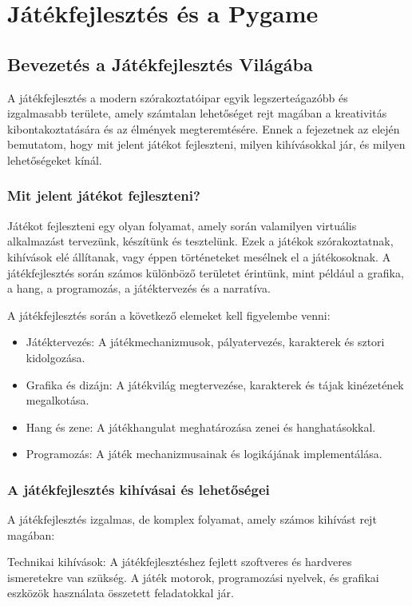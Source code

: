 \chapter{Játékfejlesztés és a Pygame}

\section{Bevezetés a Játékfejlesztés Világába}

\indent \indent A játékfejlesztés a modern szórakoztatóipar egyik legszerteágazóbb és izgalmasabb területe, amely számtalan lehetőséget rejt magában a kreativitás kibontakoztatására és az élmények megteremtésére. Ennek a fejezetnek az elején bemutatom, hogy mit jelent játékot fejleszteni, milyen kihívásokkal jár, és milyen lehetőségeket kínál.

\subsection{Mit jelent játékot fejleszteni?}
\indent \indent Játékot fejleszteni egy olyan folyamat, amely során valamilyen virtuális alkalmazást tervezünk, készítünk és tesztelünk. Ezek a játékok szórakoztatnak, kihívások elé állítanak, vagy éppen történeteket mesélnek el a játékosoknak. A játékfejlesztés során számos különböző területet érintünk, mint például a grafika, a hang, a programozás, a játéktervezés és a narratíva.

A játékfejlesztés során a következő elemeket kell figyelembe venni:

\begin{itemize}
    \item Játéktervezés: A játékmechanizmusok, pályatervezés, karakterek és sztori kidolgozása.
    \item Grafika és dizájn: A játékvilág megtervezése, karakterek és tájak kinézetének megalkotása.
    \item Hang és zene: A játékhangulat meghatározása zenei és hanghatásokkal.
    \item Programozás: A játék mechanizmusainak és logikájának implementálása.
\end{itemize}
\subsection{A játékfejlesztés kihívásai és lehetőségei}
\indent \indent A játékfejlesztés izgalmas, de komplex folyamat, amely számos kihívást rejt magában:

Technikai kihívások: A játékfejlesztéshez fejlett szoftveres és hardveres ismeretekre van szükség. A játék motorok, programozási nyelvek, és grafikai eszközök használata összetett feladatokkal jár.

